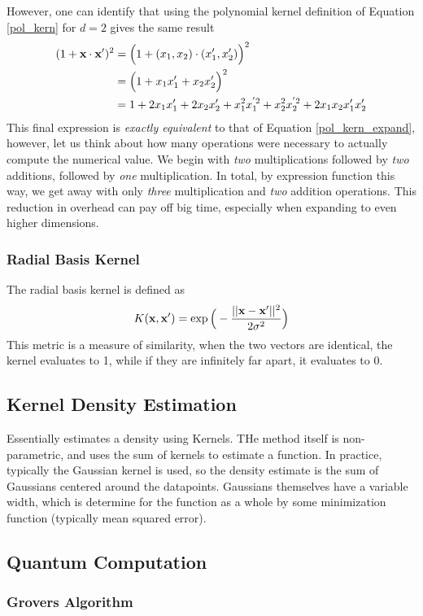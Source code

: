 However, one can identify that using the polynomial kernel definition of Equation \ref{pol_kern} for $d=2$ gives the same result
\begin{align}
	(1+ \textbf{x}\cdot \textbf{x}')^2 &= \Big(1+(x_1,x_2)\cdot(x_1',x_2')\Big)^2\\
	&= \Big(1+x_1x_1'+x_2x_2'\Big)^2\\
	&= 1 + 2x_1x_1' + 2x_2x_2' + x_1^2x_1^{'2}+x_2^2x_2^{'2} + 2x_1x_2x_1'x_2'
\end{align}
This final expression is \emph{exactly equivalent} to that of Equation \ref{pol_kern_expand}, however, let us think about how many operations were necessary to actually compute the numerical value. We begin with \emph{two} multiplications followed by \emph{two} additions, followed by \emph{one} multiplication. In total, by expression function this way, we get away with only \emph{three} multiplication and \emph{two} addition operations. This reduction in overhead can pay off big time, especially when expanding to even higher dimensions.

\subsubsection{Radial Basis Kernel}
The radial basis kernel is defined as 
\begin{align}
		K(\textbf{x},\textbf{x}') = \exp\Big(-\frac{||\textbf{x}-\textbf{x}'||^2}{2\sigma^2}\Big)
\end{align}
This metric is a measure of similarity, when the two vectors are identical, the kernel evaluates to 1, while if they are infinitely far apart, it evaluates to 0.

\subsection{Kernel Density Estimation}
Essentially estimates a density using Kernels. THe method itself is non-parametric, and uses the sum of kernels to estimate a function. In practice, typically the Gaussian kernel is used, so the density estimate is the sum of Gaussians centered around the datapoints. Gaussians themselves have a variable width, which is determine for the function as a whole by some minimization function (typically mean squared error).

\subsection{Quantum Computation}
\subsubsection{Grovers Algorithm}
